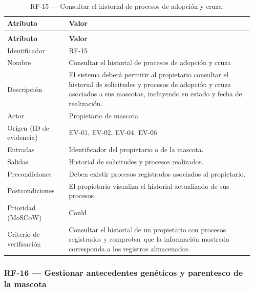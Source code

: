 \documentclass[journal,onecolumn]{IEEEtran}
\makeatletter
\newenvironment{atributos}[2]{%
	\small
	\begin{longtable}{@{}>{\raggedright\arraybackslash}p{4.2cm} >{\raggedright\arraybackslash}p{11.2cm}@{}}
		\caption{#2}\label{tab:#1}\\
		\toprule
		\textbf{Atributo} & \textbf{Valor} \\
		\midrule
		\endfirsthead
		\multicolumn{2}{@{}l}{\small\itshape (continuación)}\\
		\toprule
		\textbf{Atributo} & \textbf{Valor} \\
		\midrule
		\endhead
		\bottomrule
		\endlastfoot
	}{%
	\end{longtable}
	\normalsize
}
\makeatother
\begin{document}
	\begin{atributos}{RF-15}{RF-15 --- Consultar el historial de procesos de adopción y cruza.}
		Identificador & RF-15 \\
		Nombre & Consultar el historial de procesos de adopción y cruza \\
		Descripción & El sistema deberá permitir al propietario consultar el historial de solicitudes y procesos de adopción y cruza asociados a sus mascotas, incluyendo su estado y fecha de realización. \\
		Actor & Propietario de mascota \\
		Origen (ID de evidencia) & EV-01, EV-02, EV-04, EV-06 \\
		Entradas & Identificador del propietario o de la mascota. \\
		Salidas & Historial de solicitudes y procesos realizados. \\
		Precondiciones & Deben existir procesos registrados asociados al propietario. \\
		Postcondiciones & El propietario visualiza el historial actualizado de sus procesos. \\
		Prioridad (MoSCoW) & Could \\
		Criterio de verificación & Consultar el historial de un propietario con procesos registrados y comprobar que la información mostrada corresponda a los registros almacenados. \\
	\end{atributos}
	
	\subsubsection{RF-16 --- Gestionar antecedentes genéticos y parentesco de la mascota}
	
\end{document}
